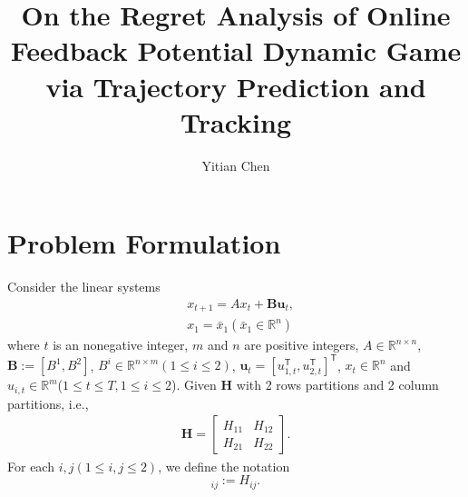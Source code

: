 \documentclass{article}
\title{On the Regret Analysis of Online Feedback Potential Dynamic Game via Trajectory Prediction and Tracking}
\author{Yitian Chen}
\newcommand{\transpose}{\mathsf{T}}
\begin{document}
\maketitle

\section{Problem Formulation}
Consider the linear systems
\begin{align}
    &x_{t+1} = Ax_{t} + \mathbf{B}\mathbf{u}_{t}\label{eq:linsys},\\
    &x_{1} =\bar{x}_{1}(\bar{x}_1 \in \mathbb{R}^{n})\label{eq:initialx}
\end{align}
where $t$ is an nonegative integer, $m$ and $n$ are positive integers, $A \in \mathbb{R}^{n\times n}$, $\mathbf{B} := [B^{1}, B^{2}]$, $B^{i} \in \mathbb{R}^{n\times m}(1\leq i \leq 2)$, $\mathbf{u}_{t} = [u_{1,t}^{\transpose},u_{2,t}^{\transpose}]^{\transpose}$, $x_{t}\in\mathbb{R}^n$ and $u_{i,t} \in \mathbb{R}^{m}$($1\leq t \leq T,1\leq i \leq 2$). 
Given $\mathbf{H}$ with 2 rows partitions and 2 column partitions, i.e.,
\begin{align*}
    \mathbf{H} = 
    \begin{bmatrix}
        H_{11} & H_{12}\\
        H_{21} & H_{22}
    \end{bmatrix}.
\end{align*}
For each $i,j(1\leq i,j\leq 2)$, we define the notation
\begin{equation}
    [\mathbf{H}]_{ij} := H_{ij}.
\end{equation}
\end{document}
